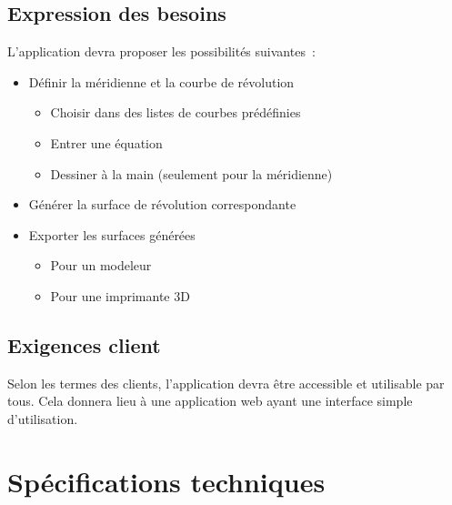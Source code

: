 \documentclass{scrartcl}
\begin{document}
	\subsection{Expression des besoins}
		L'application devra proposer les possibilités suivantes~:
		\begin{itemize}[label={*}]
			\item Définir la méridienne et la courbe de révolution
			\begin{itemize}[label={-}]
				\item Choisir dans des listes de courbes prédéfinies
				\item Entrer une équation
				\item Dessiner à la main (seulement pour la méridienne)
			\end{itemize}
			\item Générer la surface de révolution correspondante
			\item Exporter les surfaces générées
			\begin{itemize}[label={-}]
				\item Pour un modeleur
				\item Pour une imprimante 3D
			\end{itemize}
		\end{itemize}

	\subsection{Exigences client}
		Selon les termes des clients, l'application devra être accessible et utilisable par tous. Cela donnera lieu à une application web ayant une interface simple d'utilisation.




			
\section{Spécifications techniques}		

\end{document}

